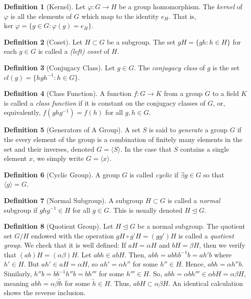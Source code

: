 \documentclass{article}
\theoremstyle{definition}
\newtheorem{definition}{Definition}[subsection]
\begin{document}
\begin{definition}[Kernel]
    Let $\varphi:G\rightarrow H$ be a group homomorphism. The \textit{kernel} of $\varphi$ is all the elements of $G$ which map to the identity $e_H$. That is, $\text{ker }\varphi =\{g\in G: \varphi(g)=e_H\}$.
\end{definition}
\begin{definition}[Coset]
    Let $H\subset G$ be a subgroup. The set $gH=\{gh:h\in H\}$ for each $g\in G$ is called a \textit{(left) coset} of $H$.
\end{definition}
\begin{definition}[Conjugacy Class]
    Let $g\in G$. The \textit{conjugacy class} of $g$ is the set $cl(g)=\{hgh^{-1}:h\in G\}$.
\end{definition}
\begin{definition}[Class Function]
    A function $f:G\rightarrow K$ from a group $G$ to a field $K$ is called a \textit{class function} if it is constant on the conjugacy classes of $G$, or, equivalently, $f(ghg^{-1})=f(h)$ for all $g,h\in G$.
\end{definition}
\begin{definition}[Generators of A Group]
    A set $S$ is said to \textit{generate} a group $G$ if the every element of the group is a combination of finitely many elements in the set and their inverses, denoted $G=\langle S\rangle$. In the case that $S$ contains a single element $x$, we simply write $G=\langle x \rangle$.
\end{definition}
\begin{definition}[Cyclic Group]
    A group $G$ is called \textit{cyclic} if $\exists g\in G$ so that $\langle g \rangle = G$.
\end{definition}
\begin{definition}[Normal Subgroup]
    A subgroup $H\subset G$ is called a \textit{normal} subgroup if $ghg^{-1}\in H$ for all $g\in G$. This is usually denoted $H\unlhd G$.
\end{definition}
\begin{definition}[Quotient Group]
    Let $H\unlhd G$ be a normal subgroup. The quotient set $G/H$ endowed with the operation $gH\circ g'H=(gg')H$ is called a \textit{quotient group}. We check that it is well defined:
    \newline
    \newline
    If $aH=\alpha H$ and $bH =\beta H$, then we verify that $(ab)H=(\alpha\beta)H$. Let $abh\in abH$. Then, $abh=abhb^{-1}b=ah'b$ where $h'\in H$. But $ah'\in aH=\alpha H$, so $ah'=\alpha h''$ for some $h''\in H$. Hence, $abh=\alpha h'' b$. Similarly, $h'' b=bb^{-1}h''b=bh'''$ for some $h'''\in H$. So, $abh=\alpha bh'''\in\alpha bH=\alpha\beta H$, meaning $abh=\alpha\beta \tilde{h}$ for some $\tilde{h}\in H$. Thus, $abH\subset \alpha\beta H$. An identical calculation shows the reverse inclusion. 
\end{definition}
\end{document}
